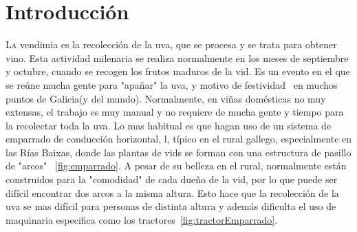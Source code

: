 \chapter{Introducción}
\label{chap:introducion}


\lettrine{L}{a} vendimia es la recolección de la uva, que se procesa y se trata para obtener vino. 
Esta actividad milenaria se realiza normalmente en los meses de septiembre y octubre, cuando se recogen los frutos maduros de la vid.
Es un evento en el que se reúne mucha gente para "apañar" la uva, y motivo de festividad~\cite{Vendimia} en muchos puntos de Galicia(y del mundo).
Normalmente, en viñas domésticas no muy extensas, el trabajo es muy manual y no requiere de mucha gente y tiempo para la recolectar toda la uva.
Lo mas habitual es que hagan uso de un sistema de emparrado de conducción horizontal, l, típico en el rural gallego, especialmente en las Rías Baixas, 
donde las plantas de vids se forman con una estructura de pasillo de "arcos" ~\ref{fig:emparrado}. A pesar de su belleza en el rural, normalmente están construidos 
para la "comodidad" de cada dueño de la vid, por lo que puede ser difícil encontrar dos arcos a la misma altura. Esto hace que la recolección de la uva se mas difícil para personas de distinta altura 
y además dificulta el uso de maquinaria especifica como los tractores~\ref{fig:tractorEmparrado}.


